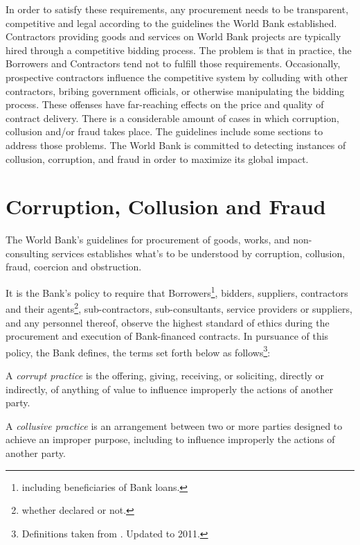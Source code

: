 In order to satisfy these requirements, any procurement needs to be transparent, competitive and legal according to the guidelines the World Bank established. Contractors providing goods and services on World Bank projects are typically hired through a competitive bidding process. The problem is that in practice, the Borrowers and Contractors tend not to fulfill those requirements. Occasionally, prospective contractors influence the competitive system by colluding with other contractors, bribing government officials, or otherwise manipulating the bidding process. These offenses have far-reaching effects on the price and quality of contract delivery.  There is a considerable amount of cases in which corruption, collusion and/or fraud takes place. The guidelines include some sections to address those problems. The World Bank is committed to detecting instances of collusion, corruption, and fraud in order to maximize its global impact.

\section{Corruption, Collusion and Fraud}\label{sec_intro_corruption}

The World Bank's guidelines for procurement of goods, works, and non-consulting services \parencite{wb_g_proc} establishes what's to be understood by corruption, collusion, fraud, coercion and obstruction. 

It is the Bank's policy to require that Borrowers\footnote{including beneficiaries of Bank loans.}, bidders, suppliers, contractors and their agents\footnote{whether declared or not.}, sub-contractors, sub-consultants, service providers or suppliers, and any personnel thereof, observe the highest standard of ethics during the procurement and execution of Bank-financed contracts. In pursuance of this policy, the Bank defines, the terms set forth below as follows\footnote{Definitions taken from \cite{wb_g_proc}. Updated to 2011.}:

\begin{definition}\label{def_corruption}
A \textit{corrupt practice} is the offering, giving, receiving, or soliciting, directly or indirectly, of anything of value to influence improperly the actions of another party.
\end{definition}

\begin{definition}\label{def_collusion}
A \textit{collusive practice} is an arrangement between two or more parties designed to achieve an improper purpose, including to influence improperly the actions of another party.
\end{definition}

